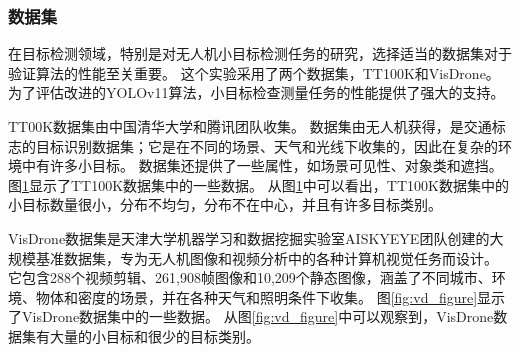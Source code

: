 \subsubsection{数据集}

在目标检测领域，特别是对无人机小目标检测任务的研究，选择适当的数据集对于验证算法的性能至关重要。
这个实验采用了两个数据集，TT100K和VisDrone。
为了评估改进的YOLOv11算法，小目标检查测量任务的性能提供了强大的支持。

TT00K数据集由中国清华大学和腾讯团队收集。
数据集由无人机获得，是交通标志的目标识别数据集；它是在不同的场景、天气和光线下收集的，因此在复杂的环境中有许多小目标。
数据集还提供了一些属性，如场景可见性、对象类和遮挡。
图\ref{fig:tt100k_figure}显示了TT100K数据集中的一些数据。
从图\ref{fig:tt100k_figure}中可以看出，TT100K数据集中的小目标数量很小，分布不均匀，分布不在中心，并且有许多目标类别。

\begin{figure}[htbp]
    \centering
    \captionsetup{font=footnotesize}
    \label{fig:tt100k_figure}
\end{figure}

VisDrone数据集是天津大学机器学习和数据挖掘实验室AISKYEYE团队创建的大规模基准数据集，专为无人机图像和视频分析中的各种计算机视觉任务而设计。
它包含288个视频剪辑、261,908帧图像和10,209个静态图像，涵盖了不同城市、环境、物体和密度的场景，并在各种天气和照明条件下收集。
图\ref{fig:vd_figure}显示了VisDrone数据集中的一些数据。
从图\ref{fig:vd_figure}中可以观察到，VisDrone数据集有大量的小目标和很少的目标类别。

